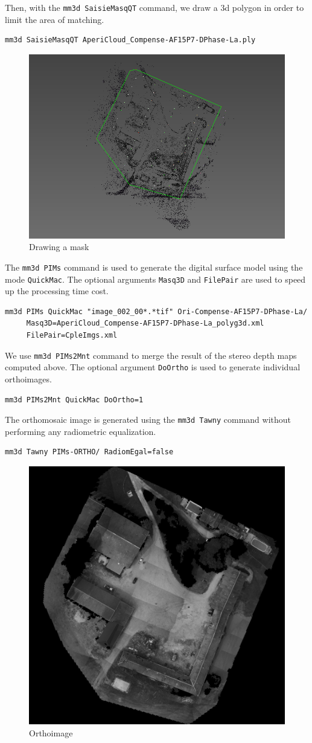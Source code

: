 Then, with the {\tt mm3d SaisieMasqQT} command, we draw a 3d polygon in order to limit the area of matching.
\begin{verbatim}
mm3d SaisieMasqQT AperiCloud_Compense-AF15P7-DPhase-La.ply
\end{verbatim}

\begin{figure}[H]
    \begin{center}
    \setlength{\unitlength}{0.5cm}
    \includegraphics[width=0.4\linewidth]{FIGS/Viabon/masq3d.png}
    \end{center}
    \caption{Drawing a mask}
    \label{fig:sel}
\end{figure}

The {\tt mm3d PIMs} command is used to generate the digital surface model using the mode {\tt QuickMac}. The optional arguments {\tt Masq3D} and {\tt FilePair} are used to speed up the processing time cost.
\begin{verbatim}
mm3d PIMs QuickMac "image_002_00*.*tif" Ori-Compense-AF15P7-DPhase-La/ 
     Masq3D=AperiCloud_Compense-AF15P7-DPhase-La_polyg3d.xml 
     FilePair=CpleImgs.xml
\end{verbatim}

We use {\tt mm3d PIMs2Mnt} command to merge the result of the stereo depth maps computed above. The optional argument {\tt DoOrtho} is used to generate individual orthoimages.
\begin{verbatim}
mm3d PIMs2Mnt QuickMac DoOrtho=1
\end{verbatim}

The orthomosaic image is generated using the {\tt mm3d Tawny} command without performing any radiometric equalization.
\begin{verbatim}
mm3d Tawny PIMs-ORTHO/ RadiomEgal=false
\end{verbatim}

\begin{figure}[H]
    \begin{center}
    \setlength{\unitlength}{0.5cm}
    \includegraphics[width=0.4\linewidth]{FIGS/Viabon/ortho.png}
    \end{center}
    \caption{Orthoimage}
    \label{fig:sel}
\end{figure}

